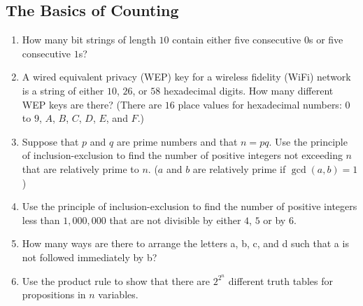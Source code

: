\documentclass{../../cls/sig-alternate-05-2015}
\begin{document}
\subsection{The Basics of Counting}
\begin{enumerate}
	\item How many bit strings of length $10$ contain either five consecutive
	$0$s or five consecutive $1$s?

	\item A wired equivalent privacy (WEP) key for a wireless fidelity
	(WiFi) network is a string of either $10$, $26$, or $58$
	hexadecimal digits. How many different WEP keys are
	there? (There are
	$16$ place values for hexadecimal numbers: $0$ to $9$, $A$, $B$, $C$, $D$, $E$, and $F$.)

	\item Suppose that $p$ and $q$ are prime numbers and that $n = pq$.
	Use the principle of inclusion-exclusion to find the number
	of positive integers not exceeding $n$ that are relatively
	prime to $n$. ($a$ and $b$ are relatively prime if $\gcd(a,b)=1$)
	
	\item Use the principle of inclusion-exclusion to find the number
	of positive integers less than $1,000,000$ that are not
	divisible by either $4$, $5$ or by $6$.
	
	\item How many ways are there to arrange the letters a, b, c,
	and d such that a is not followed immediately by b?
	
	\item Use the product rul{\tiny }e to show that there are $2^{2^n}$
	different truth tables for propositions in $n$ variables.

\end{enumerate}
\end{document}
